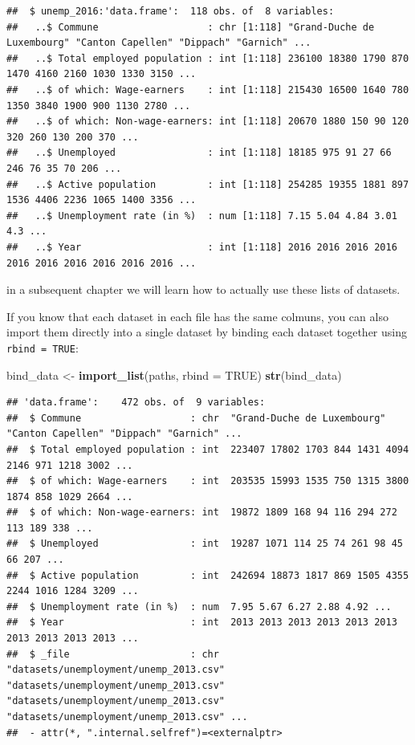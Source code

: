 \documentclass[]{gitbook}
\newenvironment{Shaded}{\begin{snugshade}}{\end{snugshade}}
\newcommand{\DataTypeTok}[1]{\textcolor[rgb]{0.13,0.29,0.53}{#1}}
\newcommand{\KeywordTok}[1]{\textcolor[rgb]{0.13,0.29,0.53}{\textbf{#1}}}
\newcommand{\NormalTok}[1]{#1}
\newcommand{\OtherTok}[1]{\textcolor[rgb]{0.56,0.35,0.01}{#1}}
\newcommand{\StringTok}[1]{\textcolor[rgb]{0.31,0.60,0.02}{#1}}
\theoremstyle{definition}
\theoremstyle{definition}
\theoremstyle{definition}
\theoremstyle{remark}
\begin{document}
\begin{verbatim}
##  $ unemp_2016:'data.frame':  118 obs. of  8 variables:
##   ..$ Commune                   : chr [1:118] "Grand-Duche de Luxembourg" "Canton Capellen" "Dippach" "Garnich" ...
##   ..$ Total employed population : int [1:118] 236100 18380 1790 870 1470 4160 2160 1030 1330 3150 ...
##   ..$ of which: Wage-earners    : int [1:118] 215430 16500 1640 780 1350 3840 1900 900 1130 2780 ...
##   ..$ of which: Non-wage-earners: int [1:118] 20670 1880 150 90 120 320 260 130 200 370 ...
##   ..$ Unemployed                : int [1:118] 18185 975 91 27 66 246 76 35 70 206 ...
##   ..$ Active population         : int [1:118] 254285 19355 1881 897 1536 4406 2236 1065 1400 3356 ...
##   ..$ Unemployment rate (in %)  : num [1:118] 7.15 5.04 4.84 3.01 4.3 ...
##   ..$ Year                      : int [1:118] 2016 2016 2016 2016 2016 2016 2016 2016 2016 2016 ...
\end{verbatim}

in a subsequent chapter we will learn how to actually use these lists of
datasets.

If you know that each dataset in each file has the same colmuns, you can
also import them directly into a single dataset by binding each dataset
together using \texttt{rbind\ =\ TRUE}:

\begin{Shaded}
\begin{Highlighting}[]
\NormalTok{bind_data <-}\StringTok{ }\KeywordTok{import_list}\NormalTok{(paths, }\DataTypeTok{rbind =} \OtherTok{TRUE}\NormalTok{)}
\KeywordTok{str}\NormalTok{(bind_data)}
\end{Highlighting}
\end{Shaded}

\begin{verbatim}
## 'data.frame':    472 obs. of  9 variables:
##  $ Commune                   : chr  "Grand-Duche de Luxembourg" "Canton Capellen" "Dippach" "Garnich" ...
##  $ Total employed population : int  223407 17802 1703 844 1431 4094 2146 971 1218 3002 ...
##  $ of which: Wage-earners    : int  203535 15993 1535 750 1315 3800 1874 858 1029 2664 ...
##  $ of which: Non-wage-earners: int  19872 1809 168 94 116 294 272 113 189 338 ...
##  $ Unemployed                : int  19287 1071 114 25 74 261 98 45 66 207 ...
##  $ Active population         : int  242694 18873 1817 869 1505 4355 2244 1016 1284 3209 ...
##  $ Unemployment rate (in %)  : num  7.95 5.67 6.27 2.88 4.92 ...
##  $ Year                      : int  2013 2013 2013 2013 2013 2013 2013 2013 2013 2013 ...
##  $ _file                     : chr  "datasets/unemployment/unemp_2013.csv" "datasets/unemployment/unemp_2013.csv" "datasets/unemployment/unemp_2013.csv" "datasets/unemployment/unemp_2013.csv" ...
##  - attr(*, ".internal.selfref")=<externalptr>
\end{verbatim}
\end{document}
